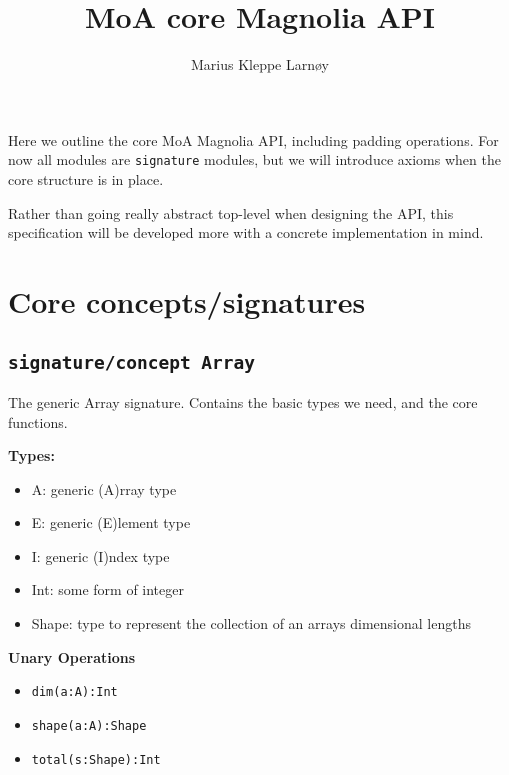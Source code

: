 \documentclass{article}
\author{Marius Kleppe Larnøy}
\begin{document}
\title{MoA core Magnolia API}
\maketitle

\noindent Here we outline the core MoA Magnolia API, including padding operations. For now all modules are \texttt{signature} modules, but we will introduce axioms when the core structure is in place.

\noindent Rather than going really abstract top-level when designing the API, this specification will be developed more with a concrete implementation in mind.

\section{Core concepts/signatures}

\subsection{\texttt{signature/concept Array}}
\noindent The generic Array signature. Contains the basic types we need, and the core functions.

\noindent \textbf{Types:}
\begin{itemize}
    \item A: generic (A)rray type
    \item E: generic (E)lement type
    \item I: generic (I)ndex type
    \item Int: some form of integer
    \item Shape: type to represent the collection of an arrays dimensional lengths
\end{itemize}

\noindent \textbf{Unary Operations}
\begin{itemize}
    \item \texttt{dim(a:A):Int}
    \item \texttt{shape(a:A):Shape}
    \item \texttt{total(s:Shape):Int}
\end{itemize}
\end{document}
